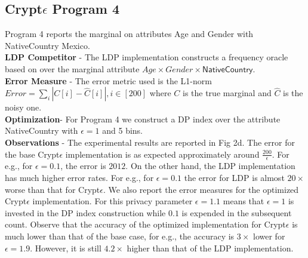 \subsection*{Crypt$\epsilon$ Program 4}
Program 4 reports the marginal on attributes \textsf{Age} and \textsf{Gender} with \textsf{NativeCountry} Mexico.  
\\\textbf{\textsf{LDP} Competitor} -  The  \textsf{LDP} implementation constructs a frequency oracle based on \cite{LDP1} over the marginal attribute $Age\times Gender\times\textsf{NativeCountry}$. 
\\\textbf{Error Measure} - The error metric used is  the L1-norm  $ Error=\sum_{i}|C[i]-\hat{C}[i]|, i \in [200]$ where $C$ is the true marginal and $\hat{C}$ is the noisy one. \\\textbf{Optimization}- For Program 4 we construct a DP index over the attribute \textsf{NativeCountry} with $\epsilon=1$ and 5 bins.
\\\textbf{Observations} - The experimental results are reported in Fig 2d. The error for the base Crypt$\epsilon$ implementation is as expected approximately around $\frac{200}{\epsilon}$. For e.g., for $\epsilon=0.1$, the error is $2012$. On the other hand, the \textsf{LDP} implementation has much higher error rates. For e.g., for $\epsilon=0.1$ the error for \textsf{LDP} is almost $20\times$ worse than that for Crypt$\epsilon$. We also report the error measures for the optimized Crypt$\epsilon$ implementation. For  this privacy parameter $\epsilon=1.1$ means that $\epsilon=1$ is invested in the DP index construction while $0.1$ is expended in the subsequent count. Observe that the accuracy of the optimized implementation for Crypt$\epsilon$ is much lower than that of the base case, for e.g., the accuracy is $3\times$ lower for $\epsilon=1.9$. However, it is still $4.2 \times$ higher than that of the \textsf{LDP} implementation.  
